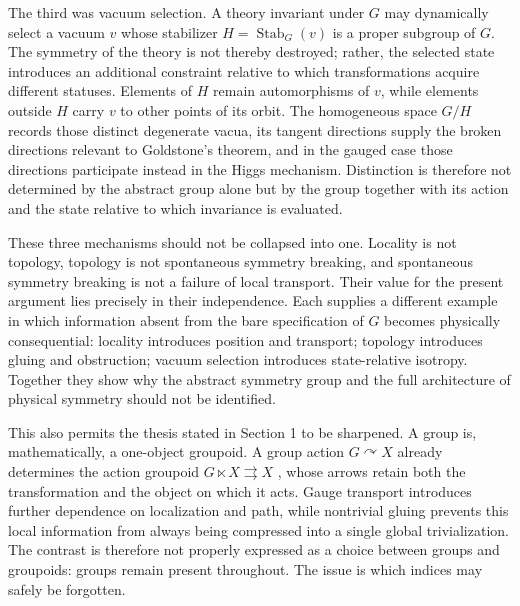 \documentclass[11pt]{article}
\begin{document}
The third was vacuum selection. A theory invariant under $G$ may dynamically select a vacuum $v$ whose stabilizer $H = \operatorname{Stab}_G(v)$ is a proper subgroup of $G$. The symmetry of the theory is not thereby destroyed; rather, the selected state introduces an additional constraint relative to which transformations acquire different statuses. Elements of $H$ remain automorphisms of $v$, while elements outside $H$ carry $v$ to other points of its orbit. The homogeneous space $G/H$ records those distinct degenerate vacua, its tangent directions supply the broken directions relevant to Goldstone's theorem, and in the gauged case those directions participate instead in the Higgs mechanism. Distinction is therefore not determined by the abstract group alone but by the group together with its action and the state relative to which invariance is evaluated.

These three mechanisms should not be collapsed into one. Locality is not topology, topology is not spontaneous symmetry breaking, and spontaneous symmetry breaking is not a failure of local transport. Their value for the present argument lies precisely in their independence. Each supplies a different example in which information absent from the bare specification of $G$ becomes physically consequential: locality introduces position and transport; topology introduces gluing and obstruction; vacuum selection introduces state-relative isotropy. Together they show why the abstract symmetry group and the full architecture of physical symmetry should not be identified.

This also permits the thesis stated in Section 1 to be sharpened. A group is, mathematically, a one-object groupoid. A group action $G \curvearrowright X$ already determines the action groupoid $G \ltimes X \rightrightarrows X$ \cite{Mackenzie1987}, whose arrows retain both the transformation and the object on which it acts. Gauge transport introduces further dependence on localization and path, while nontrivial gluing prevents this local information from always being compressed into a single global trivialization. The contrast is therefore not properly expressed as a choice between groups and groupoids: groups remain present throughout. The issue is which indices may safely be forgotten.
\end{document}
